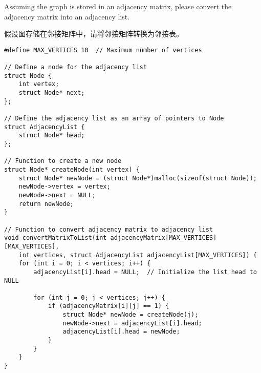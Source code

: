 \documentclass[a4paper]{article}
\begin{document}
Assuming the graph is stored in an adjacency matrix, please convert the adjacency matrix into an adjacency list. 

假设图存储在邻接矩阵中，请将邻接矩阵转换为邻接表。

\begin{verbatim}
#define MAX_VERTICES 10  // Maximum number of vertices

// Define a node for the adjacency list
struct Node {
    int vertex;
    struct Node* next;
};

// Define the adjacency list as an array of pointers to Node
struct AdjacencyList {
    struct Node* head;
};

// Function to create a new node
struct Node* createNode(int vertex) {
    struct Node* newNode = (struct Node*)malloc(sizeof(struct Node));
    newNode->vertex = vertex;
    newNode->next = NULL;
    return newNode;
}

// Function to convert adjacency matrix to adjacency list
void convertMatrixToList(int adjacencyMatrix[MAX_VERTICES][MAX_VERTICES],
	int vertices, struct AdjacencyList adjacencyList[MAX_VERTICES]) {
    for (int i = 0; i < vertices; i++) {
        adjacencyList[i].head = NULL;  // Initialize the list head to NULL

        for (int j = 0; j < vertices; j++) {
            if (adjacencyMatrix[i][j] == 1) {
                struct Node* newNode = createNode(j);
                newNode->next = adjacencyList[i].head;
                adjacencyList[i].head = newNode;
            }
        }
    }
}
\end{verbatim}
\end{document}
